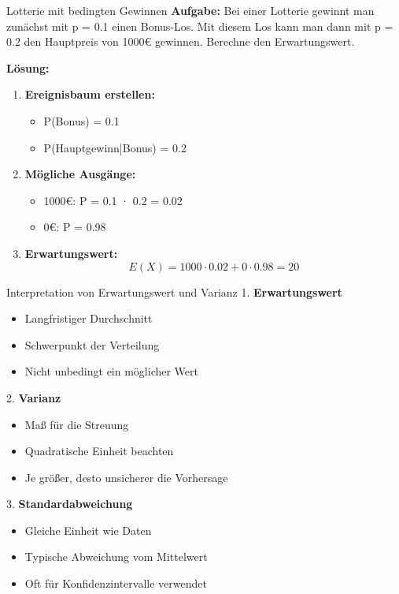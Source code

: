 \begin{example2}{Lotterie mit bedingten Gewinnen}
\textbf{Aufgabe:} Bei einer Lotterie gewinnt man zunächst mit p = 0.1 einen Bonus-Los. Mit diesem Los kann man dann mit p = 0.2 den Hauptpreis von 1000€ gewinnen. Berechne den Erwartungswert.

\textbf{Lösung:}
\begin{enumerate}
\item \textbf{Ereignisbaum erstellen:}
   \begin{itemize}
   \item P(Bonus) = 0.1
   \item P(Hauptgewinn|Bonus) = 0.2
   \end{itemize}

\item \textbf{Mögliche Ausgänge:}
   \begin{itemize}
   \item 1000€: P = 0.1 · 0.2 = 0.02
   \item 0€: P = 0.98
   \end{itemize}

\item \textbf{Erwartungswert:}
   $$E(X) = 1000 \cdot 0.02 + 0 \cdot 0.98 = 20$$
\end{enumerate}
\end{example2}

\begin{KR}{Interpretation von Erwartungswert und Varianz}
1. \textbf{Erwartungswert}
   \begin{itemize}
   \item Langfristiger Durchschnitt
   \item Schwerpunkt der Verteilung
   \item Nicht unbedingt ein möglicher Wert
   \end{itemize}

2. \textbf{Varianz}
   \begin{itemize}
   \item Maß für die Streuung
   \item Quadratische Einheit beachten
   \item Je größer, desto unsicherer die Vorhersage
   \end{itemize}

3. \textbf{Standardabweichung}
   \begin{itemize}
   \item Gleiche Einheit wie Daten
   \item Typische Abweichung vom Mittelwert
   \item Oft für Konfidenzintervalle verwendet
   \end{itemize}
\end{KR}

